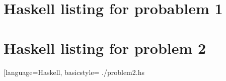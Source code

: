 \documentclass[a4paper,10pt]{article}
\begin{document}
\begin{appendices}
    \section{Haskell listing for probablem 1}
    \label{listing:a}
    

    \section{Haskell listing for problem 2}
    \label{listing:b}
    [language=Haskell, basicstyle=\scriptsize\ttfamily
        {./problem2.hs}
\end{appendices}
\end{document}
